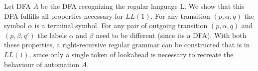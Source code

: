Let DFA $A$ be the DFA recognizing the regular language L.
We show that this DFA fulfills all properties necessary for $LL(1)$.
For any transition $(p, \alpha, q)$ the symbol $\alpha$ is a terminal symbol.
For any pair of outgoing transition $(p, \alpha, q)$ and $(p, \beta, q')$ the labels $\alpha$ and $\beta$ need to be different (since its a DFA).
With both these properties, a right-recursive regular grammar can be constructed that is in $LL(1)$, since only a single token of lookahead is necessary to recreate the behaviour of automation $A$.
